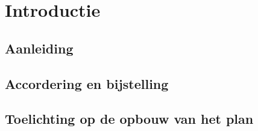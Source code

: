 \section{Introductie}
\subsection{Aanleiding}
\subsection{Accordering en bijstelling}
\subsection{Toelichting op de opbouw van het plan}
